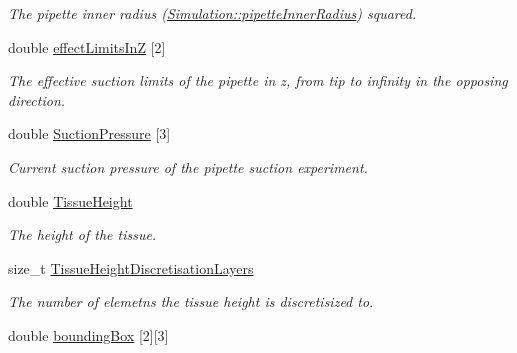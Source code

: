 \begin{DoxyCompactItemize}
\begin{DoxyCompactList}\small\item\em The pipette inner radius (\hyperlink{classSimulation_a9c0a8edcc987294ad36dc43cb0b2c77c}{Simulation\+::pipette\+Inner\+Radius}) squared. \end{DoxyCompactList}\item 
\hypertarget{classSimulation_a70a94dce9bdc0a99a99cab0abe805185}{}double \hyperlink{classSimulation_a70a94dce9bdc0a99a99cab0abe805185}{effect\+Limits\+In\+Z} \mbox{[}2\mbox{]}\label{classSimulation_a70a94dce9bdc0a99a99cab0abe805185}

\begin{DoxyCompactList}\small\item\em The effective suction limits of the pipette in z, from tip to infinity in the opposing direction. \end{DoxyCompactList}\item 
\hypertarget{classSimulation_aa7b121f145af33dae88b463490aef709}{}double \hyperlink{classSimulation_aa7b121f145af33dae88b463490aef709}{Suction\+Pressure} \mbox{[}3\mbox{]}\label{classSimulation_aa7b121f145af33dae88b463490aef709}

\begin{DoxyCompactList}\small\item\em Current suction pressure of the pipette suction experiment. \end{DoxyCompactList}\item 
\hypertarget{classSimulation_adad1e5ce0657d347c8b46a4d1749caa3}{}double \hyperlink{classSimulation_adad1e5ce0657d347c8b46a4d1749caa3}{Tissue\+Height}\label{classSimulation_adad1e5ce0657d347c8b46a4d1749caa3}

\begin{DoxyCompactList}\small\item\em The height of the tissue. \end{DoxyCompactList}\item 
\hypertarget{classSimulation_af40071d89036f339dd4c1dde41951741}{}size\+\_\+t \hyperlink{classSimulation_af40071d89036f339dd4c1dde41951741}{Tissue\+Height\+Discretisation\+Layers}\label{classSimulation_af40071d89036f339dd4c1dde41951741}

\begin{DoxyCompactList}\small\item\em The number of elemetns the tissue height is discretisized to. \end{DoxyCompactList}\item 
\hypertarget{classSimulation_a8e5b5de0190d35c7984c4b393fd9fcd9}{}double \hyperlink{classSimulation_a8e5b5de0190d35c7984c4b393fd9fcd9}{bounding\+Box} \mbox{[}2\mbox{]}\mbox{[}3\mbox{]}\label{classSimulation_a8e5b5de0190d35c7984c4b393fd9fcd9}


\end{DoxyCompactItemize}
